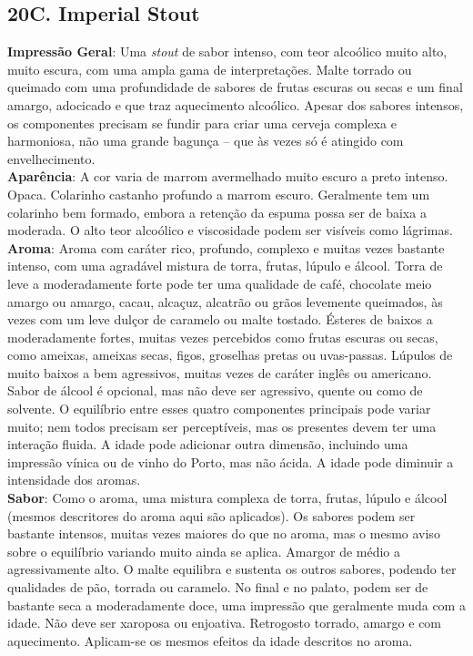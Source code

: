 \subsection*{20C. Imperial Stout}
\textbf{Impressão Geral}: Uma \textit{stout} de sabor intenso, com teor alcoólico muito alto, muito escura, com uma ampla gama de interpretações. Malte torrado ou queimado com uma profundidade de sabores de frutas escuras ou secas e um final amargo, adocicado e que traz aquecimento alcoólico. Apesar dos sabores intensos, os componentes precisam se fundir para criar uma cerveja complexa e harmoniosa, não uma grande bagunça – que às vezes só é atingido com envelhecimento. \\
\textbf{Aparência}: A cor varia de marrom avermelhado muito escuro a preto intenso. Opaca. Colarinho castanho profundo a marrom escuro. Geralmente tem um colarinho bem formado, embora a retenção da espuma possa ser de baixa a moderada. O alto teor alcoólico e viscosidade podem ser visíveis como lágrimas. \\
\textbf{Aroma}: Aroma com caráter rico, profundo, complexo e muitas vezes bastante intenso, com uma agradável mistura de torra, frutas, lúpulo e álcool. Torra de leve a moderadamente forte pode ter uma qualidade de café, chocolate meio amargo ou amargo, cacau, alcaçuz, alcatrão ou grãos levemente queimados, às vezes com um leve dulçor de caramelo ou malte tostado. Ésteres de baixos a moderadamente fortes, muitas vezes percebidos como frutas escuras ou secas, como ameixas, ameixas secas, figos, groselhas pretas ou uvas-passas. Lúpulos de muito baixos a bem agressivos, muitas vezes de caráter inglês ou americano. Sabor de álcool é opcional, mas não deve ser agressivo, quente ou como de solvente. O equilíbrio entre esses quatro componentes principais pode variar muito; nem todos precisam ser perceptíveis, mas os presentes devem ter uma interação fluida. A idade pode adicionar outra dimensão, incluindo uma impressão vínica ou de vinho do Porto, mas não ácida. A idade pode diminuir a intensidade dos aromas. \\
\textbf{Sabor}: Como o aroma, uma mistura complexa de torra, frutas, lúpulo e álcool (mesmos descritores do aroma aqui são aplicados). Os sabores podem ser bastante intensos, muitas vezes maiores do que no aroma, mas o mesmo aviso sobre o equilíbrio variando muito ainda se aplica. Amargor de médio a agressivamente alto. O malte equilibra e sustenta os outros sabores, podendo ter qualidades de pão, torrada ou caramelo. No final e no palato, podem ser de bastante seca a moderadamente doce, uma impressão que geralmente muda com a idade. Não deve ser xaroposa ou enjoativa. Retrogosto torrado, amargo e com aquecimento. Aplicam-se os mesmos efeitos da idade descritos no aroma. \\
